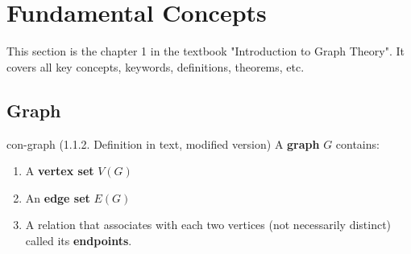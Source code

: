 \documentclass[../src/handouts/main.tex]{subfiles}
\begin{document}
\section{Fundamental Concepts}

\newcommand\bipartitegraphhelper[1]{
  \begin{tikzpicture}[
      point/.style = {circle, fill=black, inner sep=1mm}]
    \def \distance {1.5} %
    \foreach \x in {0,...,3} %
    \foreach \y in {0,...,1} %
    \node[point] (\y\x) at (\x * \distance, \y * - \distance) {};

    \draw (00) -- (10) -- (01) -- (11) -- (03) -- (10);
    \draw (12) -- (02) -- (13);

    \ifthenelse{\isempty{#1}}%
    {}%
    {
      \node at (4 * \distance, 0) {people}
      node at (4 * \distance, - \distance) {jobs};
    }%
  \end{tikzpicture}
}%

\def \bipartitegraph {\bipartitegraphhelper{}}%

\def \bipartitegraphwithlabels {\bipartitegraphhelper{with labels}}%

\def \tripartitegraph {%
  \begin{tikzpicture}[every node/.style = {circle, fill=black, inner sep=1mm}]
    \node (a1) at (-3, 1) {} %
    node (a2) at (-2, 0) {} %
    node (b1) at (-1, 3) {} %
    node (b2) at (0, 3) {} %
    node (b3) at (1, 3) {} %
    node (c1) at (2, 0) {} %
    node (c2) at (3, 1) {}; %
    \draw (b1) -- (a1) -- (b2) -- (a2) -- (c1) -- (b2) -- (c2) -- (b3) -- (c1);
  \end{tikzpicture}
}%

This section is the chapter 1 in the textbook "Introduction to Graph Theory". It covers all key concepts, keywords, definitions, theorems, etc.

\subsection{Graph}

\begin{definition}{}{con-graph}
  (1.1.2. Definition in text, modified version)
  A \textbf{graph} $G$ contains:
  \begin{enumerate}
    \item A \textbf{vertex set} $V(G)$
    \item An \textbf{edge set} $E(G)$
    \item A relation that associates with each two vertices (not necessarily distinct) called its \textbf{endpoints}.
  \end{enumerate}
\end{definition}
\end{document}
